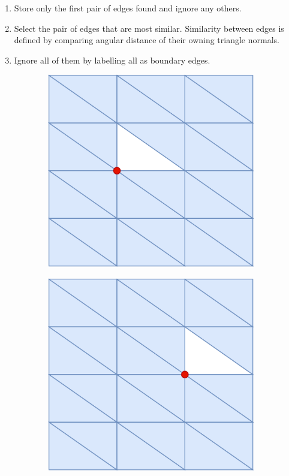 \begin{enumerate}
    \item Store only the first pair of edges found and ignore any others.
    \item Select the pair of edges that are most similar. Similarity between edges is defined by comparing angular distance of their owning triangle normals. 
    \item Ignore all of them by labelling all as boundary edges.
\end{enumerate}


\begin{figure}[H]
\centering
  \begin{subfigure}{.24\linewidth}
    \centering\includegraphics[width=.9\linewidth]{chapter_3_polylidar3d/imgs/OPCHalfEdge-ManifoldMeshA.pdf}
    \caption{\label{fig:ch3_NonMainifoldCond1A}}\vspace{6pt}
  \end{subfigure}
  \begin{subfigure}{.24\linewidth}
    \centering\includegraphics[width=.9\linewidth]{chapter_3_polylidar3d/imgs/OPCHalfEdge-ManifoldMeshB.pdf}

\end{subfigure}
\end{figure}
